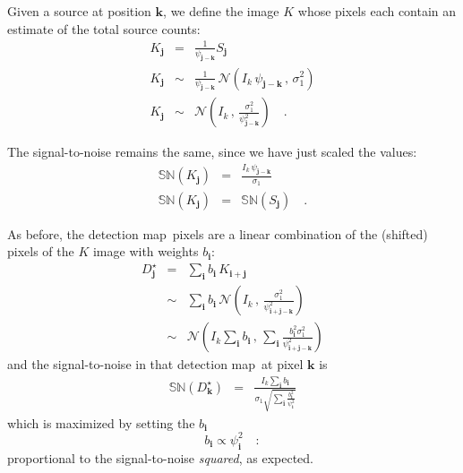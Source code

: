 \documentclass[11pt,letterpaper,linenumbers]{aastex63}
\newcommand{\detmap}{detection map}
\newcommand{\drawnfrom}{\sim}
\newcommand{\gaussianN}{\mathcal{N}}
\newcommand{\gaussian}[1]{\gaussianN\!\left(#1\right)}
\newcommand{\psf}{\psi}
\newcommand{\psfat}[1]{\psf_{#1}}
\newcommand{\snr}[1]{\mathbb{SN}(#1)}
\renewcommand{\vec}[1]{\boldsymbol{#1}}
\newcommand{\ivec}{\vec{i}}
\newcommand{\jvec}{\vec{j}}
\newcommand{\kvec}{\vec{k}}
\begin{document}
Given a source at position $\kvec$, we define the image $K$ whose
pixels each contain an estimate of the total source counts:
\begin{eqnarray}
  K_{\jvec} &=& \frac{1}{\psfat{\jvec-\kvec}} S_{\jvec}  \\
  K_{\jvec} &\drawnfrom& \frac{1}{\psfat{\jvec-\kvec}} \, \gaussian{I_k \, \psfat{\jvec-\kvec}\, , \, \sigma_1^2} \\
  K_{\jvec} &\drawnfrom& \gaussian{I_k \, , \, \frac{\sigma_1^2}{\psfat{\jvec-\kvec}^2}} \quad .
\end{eqnarray}

The signal-to-noise remains the same, since we have just scaled the
values:
\begin{eqnarray}
\snr{K_{\jvec}} &=& \frac{I_k \, \psfat{\jvec-\kvec}}{\sigma_1} \\
\snr{K_{\jvec}} &=& \snr{S_{\jvec}} \quad .
\end{eqnarray}


As before, the \detmap\ pixels are a linear combination of the
(shifted) pixels of the $K$ image with weights $b_{\ivec}$:
\begin{eqnarray}
D_{\jvec}^\star &=& \sum_{\ivec} b_{\ivec} \, K_{\ivec+\jvec} \\
&\drawnfrom& \sum_{\ivec} b_{\ivec} \, \gaussian{I_k \,,\, \frac{\sigma_1^2}{\psfat{\ivec+\jvec-\kvec}^2}} \\
&\drawnfrom& \gaussian{I_k \sum_{\ivec} b_{\ivec} \,,\, \sum_{\ivec} \frac{b_{\ivec}^2 \sigma_1^2}{\psfat{\ivec+\jvec-\kvec}^2}}
\end{eqnarray}
and the signal-to-noise in that \detmap\ at pixel $\kvec$ is
\begin{eqnarray}
\snr{D_{\kvec}^\star} &=& \frac{I_k \sum_{\ivec} b_{\ivec}}{\sigma_1 \sqrt{\sum_{\ivec} \frac{b_{\ivec}^2}{\psfat{\ivec}^2}}}
\end{eqnarray}
which is maximized by setting the $b_{\ivec}$
\begin{equation}
b_{\ivec} \propto \psfat{\ivec}^2 \quad :
\end{equation}
proportional to the signal-to-noise \emph{squared}, as expected.

%
%
%
%
\end{document}
